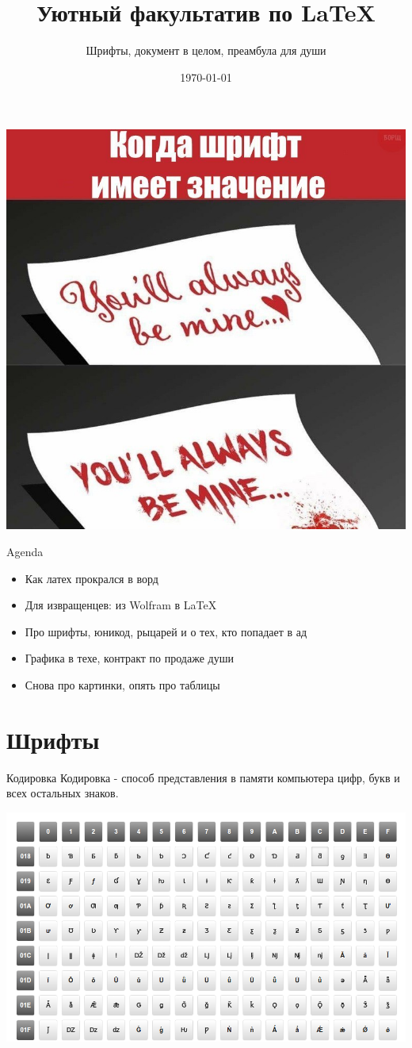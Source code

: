 \documentclass[aspectratio=169]{beamer} %
\title{Уютный факультатив по \LaTeX}
\subtitle{Шрифты, документ в целом, преамбула для души}
\date{\today}
\begin{document}
\begingroup
{}
\begin{frame}[plain]
\centering  \includegraphics[width=0.63\linewidth]{font.jpg}	
\end{frame}
\endgroup 

\maketitle


\begin{frame}{Agenda} 
\begin{itemize}
	\item Как латех прокрался в ворд
	\item Для извращенцев: из Wolfram в \LaTeX{ }
	\item Про шрифты, юникод, рыцарей и о тех, кто попадает в ад
	\item Графика в техе, контракт по продаже души
	\item Снова про картинки, опять про таблицы
\end{itemize}
\end{frame}


\section{Шрифты}  



\begin{frame}{Кодировка} 
Кодировка - способ представления в памяти компьютера цифр, букв и всех остальных знаков. 

\centering \includegraphics[width=0.68\linewidth]{codirovka.png}	
\end{frame}
\end{document}
